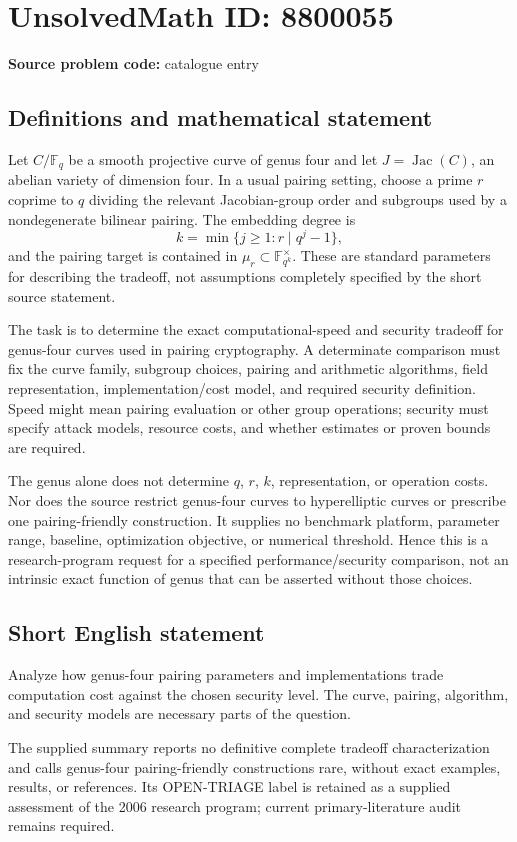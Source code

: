 \documentclass[11pt]{article}
\newcommand{\F}{\mathbb{F}}
\begin{document}
\section*{UnsolvedMath ID: 8800055}
\textbf{Source problem code:} catalogue entry
\subsection{Definitions and mathematical statement}
Let $C/\F_q$ be a smooth projective curve of genus four and let $J=\operatorname{Jac}(C)$, an abelian variety of dimension four. In a usual pairing setting, choose a prime $r$ coprime to $q$ dividing the relevant Jacobian-group order and subgroups used by a nondegenerate bilinear pairing. The embedding degree is
\[
 k=\min\{j\ge1:r\mid q^j-1\},
\]
and the pairing target is contained in $\mu_r\subset\F_{q^k}^\times$. These are standard parameters for describing the tradeoff, not assumptions completely specified by the short source statement.

The task is to determine the exact computational-speed and security tradeoff for genus-four curves used in pairing cryptography. A determinate comparison must fix the curve family, subgroup choices, pairing and arithmetic algorithms, field representation, implementation/cost model, and required security definition. Speed might mean pairing evaluation or other group operations; security must specify attack models, resource costs, and whether estimates or proven bounds are required.

The genus alone does not determine $q$, $r$, $k$, representation, or operation costs. Nor does the source restrict genus-four curves to hyperelliptic curves or prescribe one pairing-friendly construction. It supplies no benchmark platform, parameter range, baseline, optimization objective, or numerical threshold. Hence this is a research-program request for a specified performance/security comparison, not an intrinsic exact function of genus that can be asserted without those choices.
\subsection{Short English statement}
Analyze how genus-four pairing parameters and implementations trade computation cost against the chosen security level. The curve, pairing, algorithm, and security models are necessary parts of the question.

The supplied summary reports no definitive complete tradeoff characterization and calls genus-four pairing-friendly constructions rare, without exact examples, results, or references. Its OPEN-TRIAGE label is retained as a supplied assessment of the 2006 research program; current primary-literature audit remains required.
\end{document}
